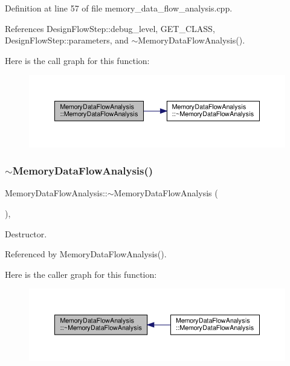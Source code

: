 Definition at line 57 of file memory\+\_\+data\+\_\+flow\+\_\+analysis.\+cpp.



References Design\+Flow\+Step\+::debug\+\_\+level, G\+E\+T\+\_\+\+C\+L\+A\+SS, Design\+Flow\+Step\+::parameters, and $\sim$\+Memory\+Data\+Flow\+Analysis().

Here is the call graph for this function\+:
\nopagebreak
\begin{figure}[H]
\begin{center}
\leavevmode
\includegraphics[width=350pt]{d7/d61/classMemoryDataFlowAnalysis_a8be6f0e3914bb0d43066bebde0001466_cgraph}
\end{center}
\end{figure}
\mbox{\label{classMemoryDataFlowAnalysis_abed28970b39608c42f92a586d57177fb}} 
\subsubsection{\texorpdfstring{$\sim$\+Memory\+Data\+Flow\+Analysis()}{~MemoryDataFlowAnalysis()}}
{\footnotesize\ttfamily Memory\+Data\+Flow\+Analysis\+::$\sim$\+Memory\+Data\+Flow\+Analysis (\begin{DoxyParamCaption}{ }\end{DoxyParamCaption})\hspace{0.3cm}{\ttfamily [override]}, {\ttfamily [default]}}



Destructor. 



Referenced by Memory\+Data\+Flow\+Analysis().

Here is the caller graph for this function\+:
\nopagebreak
\begin{figure}[H]
\begin{center}
\leavevmode
\includegraphics[width=350pt]{d7/d61/classMemoryDataFlowAnalysis_abed28970b39608c42f92a586d57177fb_icgraph}
\end{center}
\end{figure}


